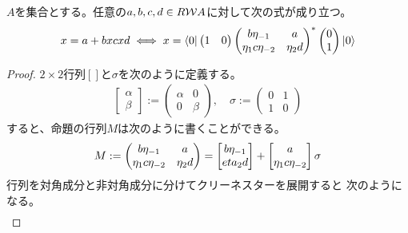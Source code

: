 {	\begin{proposition}[二次方程式の摂動展開]\label{prop:二次方程式の摂動展開} %
		$A$を集合とする。任意の$a,b,c,d\in R{{\mathcal{W}}} A$に対して次の式が成り立つ。
		\begin{equation*}\begin{split}
			x = a + bxcxd \iff x = \mathinner{\langle{0}|}\begin{pmatrix}
				1 & 0
			\end{pmatrix}\begin{pmatrix}
				b\eta_{-1} & a \\ \eta_{1}c\eta_{-2} & \eta_2d
			\end{pmatrix}^*\begin{pmatrix}
				0 \\ 1
			\end{pmatrix}\mathinner{|{0}\rangle}
		\end{split}\end{equation*}
	\end{proposition} %
	\begin{proof} %
		$2\times 2$行列$[]$と$\sigma$を次のように定義する。
		\begin{equation*}\begin{split}
			\begin{bmatrix}
				\alpha \\ \beta
			\end{bmatrix} := \begin{pmatrix}
				\alpha & 0 \\ 0 & \beta
			\end{pmatrix},\quad \sigma := \begin{pmatrix}
				0 & 1 \\ 1 & 0
			\end{pmatrix}
		\end{split}\end{equation*}
		すると、命題の行列$M$は次のように書くことができる。
		\begin{equation*}\begin{split}
			M := \begin{pmatrix}
				b\eta_{-1} & a \\ \eta_{1}c\eta_{-2} & \eta_2d
			\end{pmatrix} 
			= \begin{bmatrix}{b\eta_{-1}}\\{eta_2d}\end{bmatrix} + \begin{bmatrix}{a}\\{\eta_{1}c\eta_{-2}}\end{bmatrix}\sigma
		\end{split}\end{equation*}
		行列を対角成分と非対角成分に分けてクリーネスターを展開すると
		次のようになる。
		\begin{equation*}\begin{split}

\end{split}
\end{equation*}
\end{proof}}
